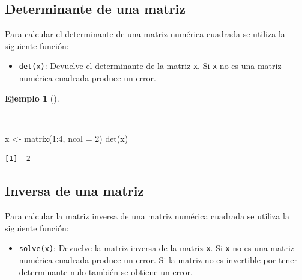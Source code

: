 \documentclass[
  a4paper,
]{scrreport}
\newenvironment{Shaded}{\begin{snugshade}}{\end{snugshade}}
\newcommand{\AttributeTok}[1]{\textcolor[rgb]{0.40,0.45,0.13}{#1}}
\newcommand{\DecValTok}[1]{\textcolor[rgb]{0.68,0.00,0.00}{#1}}
\newcommand{\FunctionTok}[1]{\textcolor[rgb]{0.28,0.35,0.67}{#1}}
\newcommand{\NormalTok}[1]{\textcolor[rgb]{0.00,0.23,0.31}{#1}}
\newcommand{\OtherTok}[1]{\textcolor[rgb]{0.00,0.23,0.31}{#1}}
\newcommand{\SpecialCharTok}[1]{\textcolor[rgb]{0.37,0.37,0.37}{#1}}
\providecommand{\tightlist}{%
  \setlength{\itemsep}{0pt}\setlength{\parskip}{0pt}}\usepackage{longtable,booktabs,array}
\theoremstyle{definition}
\theoremstyle{definition}
\newtheorem{example}{Ejemplo}[chapter]
\theoremstyle{remark}
\begin{document}
\subsection{Determinante de una
matriz}\label{determinante-de-una-matriz}

Para calcular el determinante de una matriz numérica cuadrada se utiliza
la siguiente función:

\begin{itemize}
\tightlist
\item
  \texttt{det(x)}: Devuelve el determinante de la matriz \texttt{x}. Si
  \texttt{x} no es una matriz numérica cuadrada produce un error.
\end{itemize}

\begin{example}[]\protect\hypertarget{exm-determinante}{}\label{exm-determinante}

~

\begin{Shaded}
\begin{Highlighting}[]
\NormalTok{x }\OtherTok{\textless{}{-}} \FunctionTok{matrix}\NormalTok{(}\DecValTok{1}\SpecialCharTok{:}\DecValTok{4}\NormalTok{, }\AttributeTok{ncol =} \DecValTok{2}\NormalTok{)}
\FunctionTok{det}\NormalTok{(x)}
\end{Highlighting}
\end{Shaded}

\begin{verbatim}
[1] -2
\end{verbatim}

\end{example}

\subsection{Inversa de una matriz}\label{inversa-de-una-matriz}

Para calcular la matriz inversa de una matriz numérica cuadrada se
utiliza la siguiente función:

\begin{itemize}
\tightlist
\item
  \texttt{solve(x)}: Devuelve la matriz inversa de la matriz \texttt{x}.
  Si \texttt{x} no es una matriz numérica cuadrada produce un error. Si
  la matriz no es invertible por tener determinante nulo también se
  obtiene un error.
\end{itemize}
\end{document}
